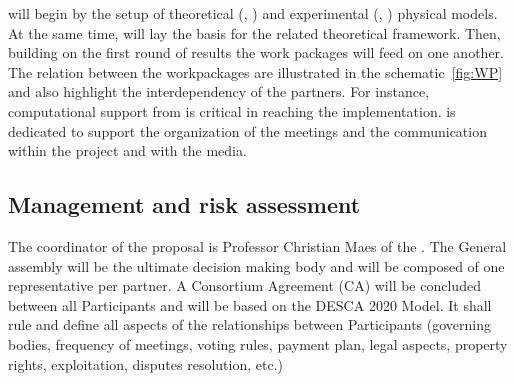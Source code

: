 \TheProject will begin by the setup of theoretical (,
) and experimental (, ) physical
models. At the same time,  will lay the basis for the related theoretical
framework.
%
Then, building on the first round of results the work packages will feed on one another.
%
The relation between the workpackages are illustrated in the schematic~\ref{fig:WP} and also
highlight the interdependency of the partners. For instance, computational support from
 is critical in reaching the implementation.
%
 is dedicated to support the organization of the meetings and the
communication within the project and with the media.

\gantttaskchart[draft,xscale=.33,yscale=.33,milestones]







\subsection{Management and risk assessment}


The coordinator of the proposal is Professor Christian Maes of the .
%
The General assembly will be the ultimate decision making body and will be composed of one
representative per partner. A Consortium Agreement (CA) will be concluded between all
Participants and will be based on the DESCA 2020 Model. It shall rule and define all aspects
of the relationships between Participants (governing bodies, frequency of meetings, voting
rules, payment plan, legal aspects, property rights, exploitation, disputes resolution,
etc.)


